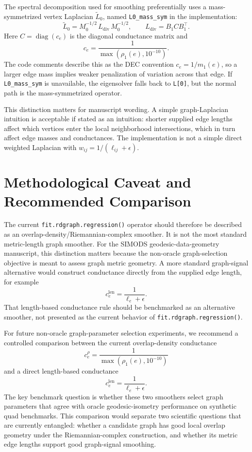 \documentclass[11pt]{article}
\newcommand{\code}[1]{\texttt{#1}}
\newcommand{\diag}{\operatorname{diag}}
\begin{document}
The spectral decomposition used for smoothing preferentially uses a
mass-symmetrized vertex Laplacian \(\widetilde L_0\), named
\code{L0\_mass\_sym} in the implementation:
\[
  \widetilde L_0
    =
    M_0^{-1/2}\, L_{\mathrm{div}}\, M_0^{-1/2},
  \qquad
  L_{\mathrm{div}} = B_1 C B_1^\top.
\]
Here \(C=\diag(c_e)\) is the diagonal conductance matrix and
\[
  c_e = \frac{1}{\max(\rho_1(e),10^{-10})}.
\]
The code comments describe this as the DEC convention \(c_e=1/m_1(e)\), so a
larger edge mass implies weaker penalization of variation across that edge. If
\code{L0\_mass\_sym} is unavailable, the eigensolver falls back to \code{L[0]},
but the normal path is the mass-symmetrized operator.

This distinction matters for manuscript wording. A simple graph-Laplacian
intuition is acceptable if stated as an intuition:
shorter supplied edge lengths affect which vertices enter the local
neighborhood intersections, which in turn affect edge masses and conductances.
The implementation is not a simple direct weighted Laplacian with
\(w_{ij}=1/(\ell_{ij}+\epsilon)\).

\section{Methodological Caveat and Recommended Comparison}

The current \code{fit.rdgraph.regression()} operator should therefore be
described as an overlap-density/Riemannian-complex smoother. It is not the most
standard metric-length graph smoother. For the SIMODS geodesic-data-geometry
manuscript, this distinction matters because the non-oracle graph-selection
objective is meant to assess graph metric geometry. A more standard graph-signal
alternative would construct conductance directly from the supplied edge length,
for example
\[
  c_e^{\mathrm{len}}
    =
    \frac{1}{\ell_e+\epsilon}.
\]
That length-based conductance rule should be benchmarked as an alternative
smoother, not presented as the current behavior of
\code{fit.rdgraph.regression()}.

For future non-oracle graph-parameter selection experiments, we recommend a
controlled comparison between the current overlap-density conductance
\[
  c_e^\rho
    =
    \frac{1}{\max(\rho_1(e),10^{-10})}
\]
and a direct length-based conductance
\[
  c_e^{\mathrm{len}}
    =
    \frac{1}{\ell_e+\epsilon}.
\]
The key benchmark question is whether these two smoothers select graph
parameters that agree with oracle geodesic-isometry performance on synthetic
quad benchmarks. This comparison would separate two scientific questions that
are currently entangled: whether a candidate graph has good local overlap
geometry under the Riemannian-complex construction, and whether its metric edge
lengths support good graph-signal smoothing.
\end{document}
